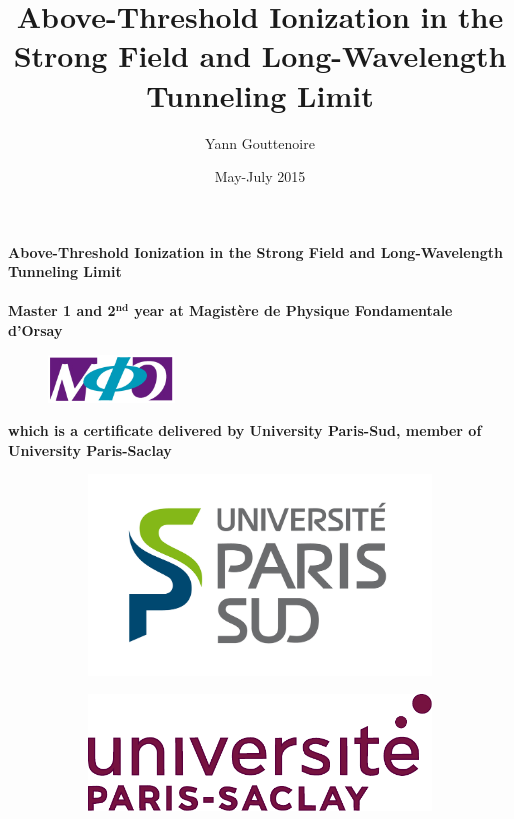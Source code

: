 \documentclass[a4paper]{article}
\title{Above-Threshold Ionization in the Strong Field and Long-Wavelength Tunneling Limit}
\author{Yann Gouttenoire}
\date{May-July 2015}
\begin{document}

\makeatletter

  \begin{titlepage}
  \centering
  {\LARGE \textbf{Above-Threshold Ionization in the Strong Field and Long-Wavelength Tunneling Limit}} \\
      \vspace{1cm}
  {\large \@author} \\
      \vspace{1cm}
  {\textbf{Master 1 and 2$^{\textbf{nd}}$ year at Magist\`ere de Physique Fondamentale d'Orsay}} \\
      \vspace{1cm}
      \begin{figure}[h]
      \centering
    \includegraphics[width=0.30\textwidth]{logo/magistere.jpg}
      \end{figure}
  {\textbf{which is a certificate delivered by University Paris-Sud, member of University Paris-Saclay}} \\ 
        
   \begin{figure}[h]
   \centering
   \begin{subfigure}[l]{0.30\textwidth}
       \includegraphics[width=\textwidth]{logo/upsud}
   \end{subfigure}
   \hfill
   \begin{subfigure}[r]{0.30\textwidth}
       \includegraphics[width=\textwidth]{logo/upsaclay}
   \end{subfigure}
   \end{figure}
        \vfill


\end{titlepage}
\end{document}

